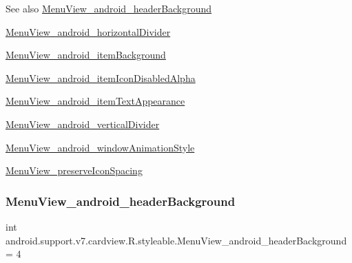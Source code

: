\begin{DoxySeeAlso}{See also}
\hyperlink{classandroid_1_1support_1_1v7_1_1cardview_1_1R_1_1styleable_ad369ecde0cd35828e7b4a9336f071466}{Menu\+View\+\_\+android\+\_\+header\+Background} 

\hyperlink{classandroid_1_1support_1_1v7_1_1cardview_1_1R_1_1styleable_a0916d50618f89895e6df0b142231d24a}{Menu\+View\+\_\+android\+\_\+horizontal\+Divider} 

\hyperlink{classandroid_1_1support_1_1v7_1_1cardview_1_1R_1_1styleable_a182217b0f7048467ba6a4b0e8a76e75c}{Menu\+View\+\_\+android\+\_\+item\+Background} 

\hyperlink{classandroid_1_1support_1_1v7_1_1cardview_1_1R_1_1styleable_acec3ed96639af2fa54857ab78e9bf691}{Menu\+View\+\_\+android\+\_\+item\+Icon\+Disabled\+Alpha} 

\hyperlink{classandroid_1_1support_1_1v7_1_1cardview_1_1R_1_1styleable_a0f18c10021a7e3cf802a23e020c87698}{Menu\+View\+\_\+android\+\_\+item\+Text\+Appearance} 

\hyperlink{classandroid_1_1support_1_1v7_1_1cardview_1_1R_1_1styleable_a53166c0c74f66a1053b4e2b8ed449af3}{Menu\+View\+\_\+android\+\_\+vertical\+Divider} 

\hyperlink{classandroid_1_1support_1_1v7_1_1cardview_1_1R_1_1styleable_a756c77c2bece7262d2b3864bd0855483}{Menu\+View\+\_\+android\+\_\+window\+Animation\+Style} 

\hyperlink{classandroid_1_1support_1_1v7_1_1cardview_1_1R_1_1styleable_a034320428c37d4f5c21c75f35207c020}{Menu\+View\+\_\+preserve\+Icon\+Spacing} 
\end{DoxySeeAlso}
\mbox{\label{classandroid_1_1support_1_1v7_1_1cardview_1_1R_1_1styleable_ad369ecde0cd35828e7b4a9336f071466}} 
\subsubsection{\texorpdfstring{Menu\+View\+\_\+android\+\_\+header\+Background}{MenuView\_android\_headerBackground}}
{\footnotesize\ttfamily int android.\+support.\+v7.\+cardview.\+R.\+styleable.\+Menu\+View\+\_\+android\+\_\+header\+Background = 4\hspace{0.3cm}{\ttfamily [static]}}

